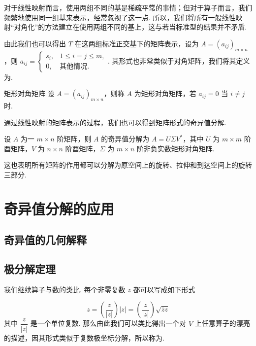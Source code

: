 对于线性映射而言，使用两组不同的基是稀疏平常的事情；但对于算子而言，我们频繁地使用同一组基来表示，经常忽视了这一点. 所以，我们将所有一般线性映射“对角化”的方法建立在使用两组不同的基上，这与若当标准型的结果并不矛盾.

由此我们也可以得出 $ T $ 在这两组标准正交基下的矩阵表示，设为 $ A = (a_{ij})_{m \times n} $，则 $ a_{ij} = \begin{cases}
        s_i, & 1 \leqslant i = j \leqslant m, \\
        0,   & \text{其他情况}.
    \end{cases} $. 其形式也非常类似于对角矩阵，我们将其定义为.

\begin{definition}{矩形对角矩阵}{} 
    设 $ A = (a_{ij})_{m \times n} $，则称 $ A $ 为矩形对角矩阵，若 $ a_{ij} = 0 $ 当 $ i \neq j $ 时.
\end{definition}

通过线性映射的矩阵表示的过程，我们也可以得到矩阵形式的奇异值分解.

\begin{theorem}{}{}
    设 $ A $ 为一 $ m \times n $ 阶矩阵，则 $ A $ 的奇异值分解为 $ A = U\Sigma V^* $，其中 $ U $ 为 $ m \times m $ 阶酉矩阵，$ V $ 为 $ n \times n $ 阶酉矩阵，$ \Sigma $ 为 $ m \times n $ 阶非负实数矩形对角矩阵.
\end{theorem}

这也表明所有矩阵的作用都可以分解为原空间上的旋转、拉伸和到达空间上的旋转三部分.

\section{奇异值分解的应用}

\subsection{奇异值的几何解释}

\subsection{极分解定理}

我们继续算子与数的类比. 每个非零复数 $ z $ 都可以写成如下形式

\[ z = \left(\frac{z}{\lvert z \rvert}\right)\lvert z \rvert = \left(\frac{z}{\lvert z \rvert}\right)\sqrt{\overline{z}z} \]
其中 $ \dfrac{z}{\lvert z \rvert} $ 是一个单位复数. 那么由此我们可以类比得出一个对 $ V $ 上任意算子的漂亮的描述，因其形式类似于复数极坐标分解，所以称为.


